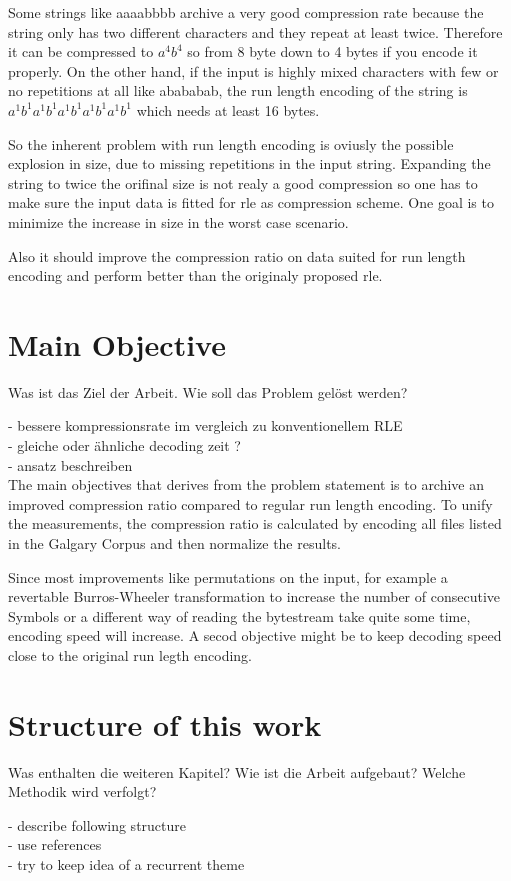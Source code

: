 Some strings like aaaabbbb archive a very good compression rate because the string only has two different characters and they repeat at least twice. Therefore it can be compressed to $a^4b^4$ so from 8 byte down to 4 bytes if you encode it properly. On the other hand, if the input is highly mixed characters with few or no repetitions at all like abababab, the run length encoding of the string is $a^1b^1a^1b^1a^1b^1a^1b^1a^1b^1$ which needs at least 16 bytes. \par
So the inherent problem with run length encoding is oviusly the possible explosion in size, due to missing repetitions in the input string. Expanding the string to twice the orifinal size is not realy a good compression so one has to make sure the input data is fitted for rle as compression scheme. One goal is to minimize the increase in size in the worst case scenario. \par
Also it should improve the compression ratio on data suited for run length encoding and perform better than the originaly proposed rle.

\section{Main Objective}
\label{ch:Introduction:sec:Main Objective}

Was ist das Ziel der Arbeit. Wie soll das Problem gelöst werden?

- bessere kompressionsrate im vergleich zu konventionellem RLE\\
- gleiche oder ähnliche decoding zeit ?\\
- ansatz beschreiben\\

The main objectives that derives from the problem statement is to archive an improved compression ratio compared to regular run length encoding. To unify the measurements, the compression ratio is calculated by encoding all files listed in the Galgary Corpus and then normalize the results. \par
Since most improvements like permutations on the input, for example a revertable Burros-Wheeler transformation to increase the number of consecutive Symbols or a different way of reading the bytestream take quite some time, encoding speed will increase. A secod objective might be to keep decoding speed close to the original run legth encoding.

\section{Structure of this work}
\label{ch:Intoduction:sec:Structure}

Was enthalten die weiteren Kapitel? Wie ist die Arbeit aufgebaut? Welche Methodik wird verfolgt?

- describe following structure\\
- use references\\
- try to keep idea of a recurrent theme\\

